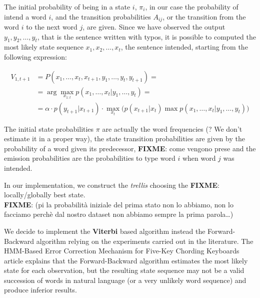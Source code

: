 The initial probability of being in a state $i$, $\pi_i$, in our case the probability of intend a word $i$, and the 
transition probabilities $A_{ij}$, or the transition from the word $i$ to the next word $j$, are given. Since we have 
observed the output $y_1, y_2, \dots , y_t$, that is the sentence written with typos, it is possible to computed the most 
likely state sequence $x_1, x_2, \dots , x_t$, the sentence intended, starting from the following expression:

\begin{equation}
	\begin{aligned}
		V_{1,t+1} &= P(x_1, \dots, x_t, x_{t+1}, y_1, \dots, y_t,  y_{t+1}) = \\
						&= \arg\max_{x_{1:t}} p(x_1, \dots, x_t | y_1, \dots, y_t) = \\
						& =  \alpha \cdot p(y_{t+1}|x_{t+1})\cdot\max_{x_t} \Big( p(x_{t+1}|x_t) \max p(x_1, \dots, x_{t}|y_1, 
						\dots, y_t)\Big)
	\end{aligned}
\end{equation}

The initial state probabilities $\pi$ are actually the word frequencies (? We don’t estimate it in a proper way), the state 
transition probabilities are given by the probability of a word given its predecessor, \textbf{FIXME}: {come vengono prese} 
and the emission probabilities are the probabilities to type word $i$ when word $j$ was intended.

In our implementation, we construct the \textit{trellis} choosing the \textbf{FIXME}: {locally/globally} best state. 
\\
\textbf{FIXME}: (pi la probabilità iniziale del prima stato non lo abbiamo, non lo facciamo perchè dal nostro dataset non 
abbiamo sempre la prima parola…)

We decide to implement the \textbf{Viterbi} based algorithm instead the Forward-Backward algorithm relying on the 
experiments carried out in the literature.
The HMM-Based Error Correction Mechanism for Five-Key Chording Keyboards article \cite{tarniceriu2015hmm} explains 
that the Forward-Backward algorithm estimates the most likely state for each observation, but the resulting state 
sequence may not be a valid succession of words in natural language (or a very unlikely word sequence) and produce 
inferior results.


